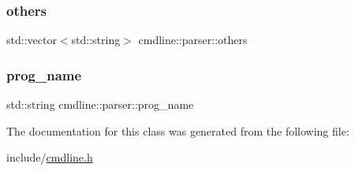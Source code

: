 \mbox{\label{classcmdline_1_1parser_aee5711cafc2f46c238fadf593e08e599}} 
\subsubsection{\texorpdfstring{others}{others}}
{\footnotesize\ttfamily std\+::vector$<$std\+::string$>$ cmdline\+::parser\+::others\hspace{0.3cm}{\ttfamily [private]}}

\mbox{\label{classcmdline_1_1parser_aacbd60921933dfc5606d22dbe1e30625}} 
\subsubsection{\texorpdfstring{prog\_name}{prog\_name}}
{\footnotesize\ttfamily std\+::string cmdline\+::parser\+::prog\+\_\+name\hspace{0.3cm}{\ttfamily [private]}}



The documentation for this class was generated from the following file\+:\begin{DoxyCompactItemize}
\item 
include/\mbox{\hyperlink{cmdline_8h}{cmdline.\+h}}\end{DoxyCompactItemize}
